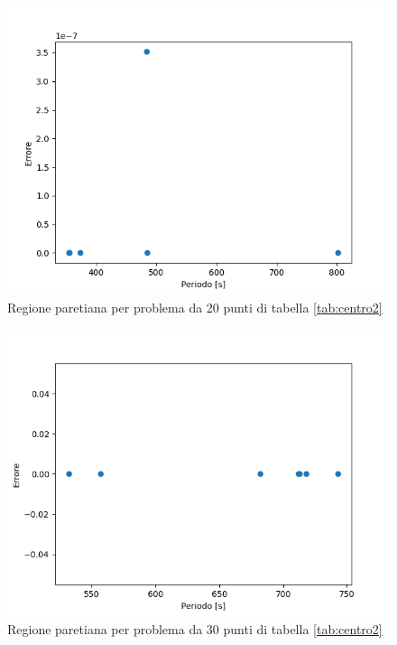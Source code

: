 \documentclass[a4paper,12pt]{report}
\begin{document}
\begin{itemize}
    \begin{figure}[H]
      \centering
      \includegraphics[scale=0.70]{img/puls0125/standard20.png}
      \caption{Regione paretiana per problema da 20 punti di tabella \ref{tab:centro2}}
      \label{fig:reg_ammis_20_0125_std}
    \end{figure}

    \begin{figure}[H]
      \centering
      \includegraphics[scale=0.70]{img/puls0125/standard30.png}
      \caption{Regione paretiana per problema da 30 punti di tabella \ref{tab:centro2}}
      \label{fig:reg_ammis_30_0125_std}
    \end{figure}


\end{itemize}
\end{document}
